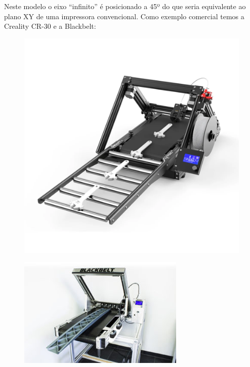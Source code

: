\documentclass[12pt, english]{article}
\begin{document}
\begin{enumerate}[leftmargin=*, listparindent=0.7cm]
{		
		Neste modelo o eixo “infinito” é posicionado a 45º do que seria equivalente ao plano XY de uma impressora convencional. Como exemplo comercial temos a Creality CR-30 e a Blackbelt:
		
		\begin{figure}[H]
			\centering
			\begin{minipage}{.5\textwidth}
				\centering
				\includegraphics[height=.8\linewidth]{CR30.png}
				\label{fig:cr30}
			\end{minipage}%
			\begin{minipage}{.5\textwidth}
				\centering
				\includegraphics[height=.8\linewidth]{Blackbelt.png}
				\label{fig:blackbelt}
			\end{minipage}
		\end{figure}

}
\end{enumerate}
\end{document}
